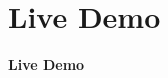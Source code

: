 \section{Live Demo}
\begin{frame}
	\begin{center}
		{\fontsize{20}{20}\selectfont
			\textbf{Live Demo}
		}
	\end{center}
\end{frame}

